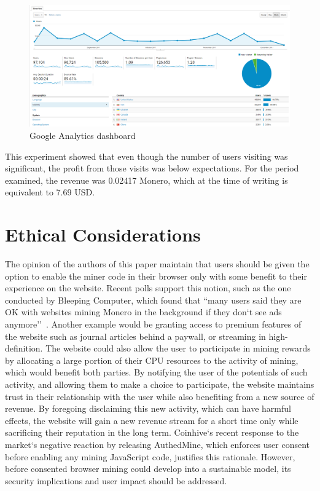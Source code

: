 \begin{figure}[t]
\centering
\includegraphics[width=\linewidth]{figures/experiment_analytics_results.png}
\caption{Google Analytics dashboard}
\end{figure}


This experiment showed that even though the number of users visiting was significant, the profit from those visits was below expectations. For the period examined, the revenue was 0.02417 Monero, which at the time of writing is equivalent to 7.69 USD.




\section{Ethical Considerations}
\label{sec:ethics}

The opinion of the authors of this paper maintain that users should be given the option to enable the miner code in their browser only with some benefit to their experience on the website. Recent polls support this notion, such as the one conducted by Bleeping Computer, which found that ``many users said they are OK with websites mining Monero in the background if they don`t see ads anymore''~\cite{bleepingcomputerminers}. Another example would be granting access to premium features of the website such as journal articles behind a paywall, or streaming in high-definition. The website could also allow the user to participate in mining rewards by allocating a large portion of their CPU resources to the activity of mining, which would benefit both parties. By notifying the user of the potentials of such activity, and allowing them to make a choice to participate, the website maintains trust in their relationship with the user while also benefiting from a new source of revenue. By foregoing disclaiming this new activity, which can have harmful effects, the website will gain a new revenue stream for a short time only while sacrificing their reputation in the long term. Coinhive`s recent response to the market`s negative reaction by releasing AuthedMine, which enforces user consent before enabling any mining JavaScript code, justifies this rationale. However, before consented browser mining could develop into a sustainable model, its security implications and user impact should be addressed.


